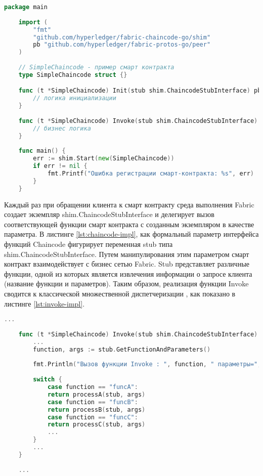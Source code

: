 \begin{lstlisting}[caption={Реализация Chaincode},label={lst:chaincode-impl},language=Go]
	package main
	
	import (
		"fmt"
		"github.com/hyperledger/fabric-chaincode-go/shim"
		pb "github.com/hyperledger/fabric-protos-go/peer"
	)
	
	// SimpleChaincode - пример смарт контракта
	type SimpleChaincode struct {}

	func (t *SimpleChaincode) Init(stub shim.ChaincodeStubInterface) pb.Response {
		// логика инициализации
	}
	
	func (t *SimpleChaincode) Invoke(stub shim.ChaincodeStubInterface) pb.Response {
		// бизнес логика
	}
	
	func main() {
		err := shim.Start(new(SimpleChaincode))
		if err != nil {
			fmt.Printf("Ошибка регистрации смарт-контракта: %s", err)
		}
	}
\end{lstlisting}


Каждый раз при обращении клиента к смарт контракту среда выполнения Fabric создает экземпляр shim.ChaincodeStubInterface и делегирует вызов соответствующей функции смарт контракта с созданным экземпляром в качестве параметра. В листинге \ref{lst:chaincode-impl}, как формальный параметр интерфейса функций Chaincode фигурирует переменная stub типа shim.ChaincodeStubInterface. Путем манипулирования этим параметром смарт контракт взаимодействует с бизнес сетью Fabric. Stub представляет различные функции, одной из которых является извлечения информации о запросе клиента (название функции и параметров). Таким образом, реализация функции Invoke сводится к классической множественной диспетчеризации \cite{solid}, как показано в листинге \ref{lst:invoke-impl}.

\begin{lstlisting}[caption={Шаблон реализации Chaincode.Invoke},label={lst:invoke-impl},language=Go]
	...
	
	func (t *SimpleChaincode) Invoke(stub shim.ChaincodeStubInterface) pb.Response {
		...
		function, args := stub.GetFunctionAndParameters()
		
		fmt.Println("Вызов функции Invoke : ", function, " параметры=", args)
		
		switch {
			case function == "funcA":
			return processA(stub, args)
			case function == "funcB":
			return processB(stub, args)
			case function == "funcC":
			return processC(stub, args)
			...
		}
		...
	}
	
	...
\end{lstlisting}

